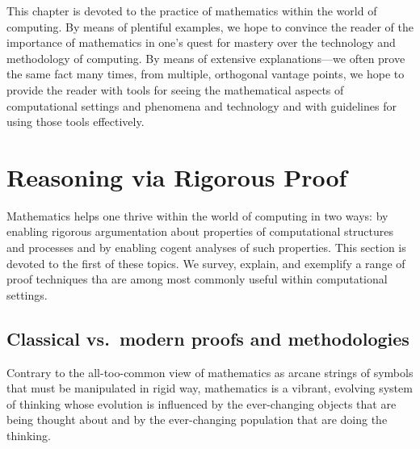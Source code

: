 This chapter is devoted to the practice of mathematics within the
world of computing.  By means of plentiful examples, we hope to
convince the reader of the importance of mathematics in one's quest
for mastery over the technology and methodology of computing.  By
means of extensive explanations---we often prove the same fact many
times, from multiple, orthogonal vantage points, we hope to provide
the reader with tools for seeing the mathematical aspects of
computational settings and phenomena and technology and with
guidelines for using those tools effectively.

\section{Reasoning via Rigorous Proof}
\label{sec:reasoning-via-proofs}

Mathematics helps one thrive within the world of computing in two
ways: by enabling rigorous argumentation about properties of
computational structures and processes and by enabling cogent analyses
of such properties.  This section is devoted to the first of these
topics.  We survey, explain, and exemplify a range of proof techniques
tha are among most commonly useful within computational settings.

\subsection{Classical vs.~modern proofs and methodologies}
\label{sec:classical-v-modern-proofs}

Contrary to the all-too-common view of mathematics as arcane strings
of symbols that must be manipulated in rigid way, mathematics is a
vibrant, evolving system of thinking whose evolution is influenced by
the ever-changing objects that are being thought about and by the
ever-changing population that are doing the thinking.

